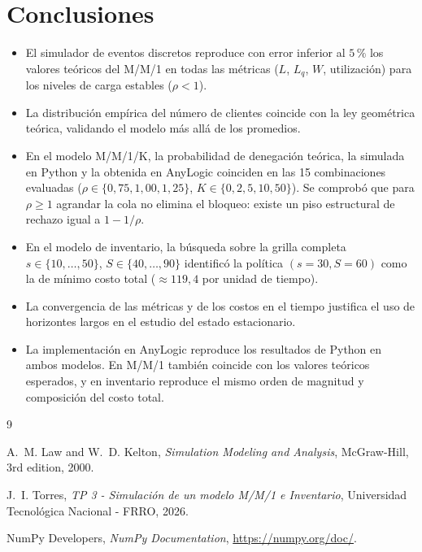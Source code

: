 \documentclass{article}
\begin{document}
\section{Conclusiones}

\begin{itemize}
    \item El simulador de eventos discretos reproduce con error inferior
    al $5\,\%$ los valores teóricos del M/M/1 en todas las métricas ($L$,
    $L_q$, $W$, utilización) para los niveles de carga estables ($\rho <
    1$).
    \item La distribución empírica del número de clientes coincide con la
    ley geométrica teórica, validando el modelo más allá de los
    promedios.
    \item En el modelo M/M/1/K, la probabilidad de denegación teórica, la
    simulada en Python y la obtenida en AnyLogic coinciden en las 15
    combinaciones evaluadas ($\rho \in
    \{0{,}75,1{,}00,1{,}25\}$, $K \in \{0,2,5,10,50\}$). Se comprobó que
    para $\rho \geq 1$ agrandar la cola no elimina el bloqueo: existe un
    piso estructural de rechazo igual a $1-1/\rho$.
    \item En el modelo de inventario, la búsqueda sobre la grilla completa
    $s\in\{10,\ldots,50\}$, $S\in\{40,\ldots,90\}$ identificó la política
    $(s=30, S=60)$ como la de mínimo costo total ($\approx 119{,}4$ por
    unidad de tiempo).
    \item La convergencia de las métricas y de los costos en el tiempo
    justifica el uso de horizontes largos en el estudio del estado
    estacionario.
    \item La implementación en AnyLogic reproduce los resultados de Python
    en ambos modelos. En M/M/1 también coincide con los valores teóricos
    esperados, y en inventario reproduce el mismo orden de magnitud y
    composición del costo total.
\end{itemize}



\begin{thebibliography}{9}

A.~M. Law and W.~D. Kelton, \textit{Simulation Modeling and Analysis},
McGraw-Hill, 3rd edition, 2000.

J.~I. Torres, \textit{TP 3 - Simulación de un modelo M/M/1 e Inventario},
Universidad Tecnológica Nacional - FRRO, 2026.

NumPy Developers, \textit{NumPy Documentation},
\url{https://numpy.org/doc/}.

\end{thebibliography}
\end{document}
